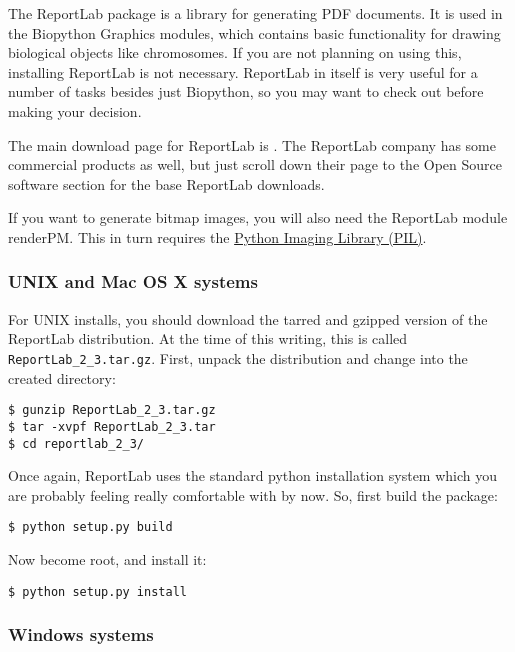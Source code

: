 \documentclass{article}
\begin{document}
The ReportLab package is a library for generating PDF documents. It is
used in the Biopython Graphics modules, which contains basic
functionality for drawing biological objects like chromosomes. If you
are not planning on using this, installing ReportLab is not necessary.
ReportLab in itself is very useful for a number of tasks besides just
Biopython, so you may want to check out
 before making your decision.

The main download page for ReportLab is
. The ReportLab
company has some commercial products as well, but just scroll down their
page to the Open Source software section for the base ReportLab
downloads.

If you want to generate bitmap images, you will also need the ReportLab
module renderPM.  This in turn requires the
\href{http://www.pythonware.com/products/pil/}{Python Imaging Library (PIL)}.

\subsubsection{UNIX and Mac OS X systems}

For UNIX installs, you should download the tarred and gzipped version of
the ReportLab distribution. At the time of this writing, this is called
\verb|ReportLab_2_3.tar.gz|. First, unpack the distribution and change
into the created directory:

\begin{verbatim}
$ gunzip ReportLab_2_3.tar.gz
$ tar -xvpf ReportLab_2_3.tar
$ cd reportlab_2_3/
\end{verbatim}

Once again, ReportLab uses the standard python installation system which
you are probably feeling really comfortable with by now. So, first build
the package:

\begin{verbatim}
$ python setup.py build
\end{verbatim}

Now become root, and install it:

\begin{verbatim}
$ python setup.py install
\end{verbatim}

\subsubsection{Windows systems}
\end{document}

